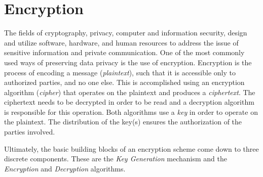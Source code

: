 \section{Encryption}\label{s:encryption}
The fields of cryptography, privacy, computer and information security, design and utilize software, hardware, and human resources to address the issue of sensitive information and private communication.
One of the most commonly used ways of preserving data privacy is the use of encryption. Encryption is the process of encoding a message (\textit{plaintext}), such that it is accessible only to authorized parties, and no one else.
This is accomplished using an encryption algorithm (\textit{cipher}) that operates on the plaintext and produces a \textit{ciphertext}.
The ciphertext needs to be decrypted in order to be read and a decryption algorithm is responsible for this operation.
Both algorithms use a \textit{key} in order to operate on the plaintext.
The distribution of the key(s) ensures the authorization of the parties involved.

Ultimately, the basic building blocks of an encryption scheme come down to three discrete components.
These are the \textit{Key Generation} mechanism and the \textit{Encryption} and \textit{Decryption} algorithms.

